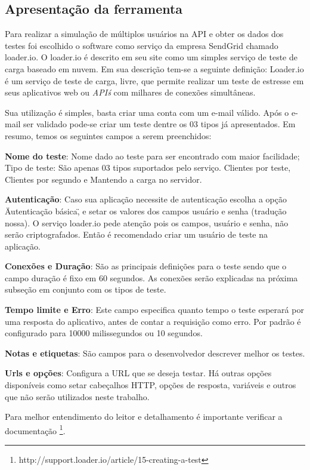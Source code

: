 \subsection{Apresentação da ferramenta}
  
  Para realizar a simulação de múltiplos usuários na \ac{API} e obter os dados dos testes foi 
  escolhido o software como serviço da empresa SendGrid chamado loader.io. O loader.io é descrito em seu site
  como um simples serviço de teste de carga baseado em nuvem. Em sua descrição tem-se a seguinte
  definição: Loader.io é um serviço de teste de carga, livre, que permite realizar um teste de estresse em 
  seus aplicativos web ou \textit{API\'s} com milhares de conexões simultâneas.
  
  Sua utilização é simples, basta criar uma conta com um e-mail válido. Após o e-mail ser validado pode-se 
  criar um teste dentre os 03 tipos já apresentados. Em resumo, temos os seguintes campos a serem preenchidos:
  
  \textbf{Nome do teste}: Nome dado ao teste para ser encontrado com maior facilidade;
  Tipo de teste: São apenas 03 tipos suportados pelo serviço. Clientes por teste, Clientes por segundo e Mantendo 
  a carga no servidor.
  
  \textbf{Autenticação}: Caso sua aplicação necessite de autenticação escolha a opção \"Autenticação básica\",
  e setar os valores dos campos usuário e senha (tradução nossa). O serviço loader.io pede atenção 
  pois os campos, usuário e senha, não serão criptografados. Então é recomendado criar um usuário de teste na aplicação.
  
  \textbf{Conexões e Duração}: São as principais definições para o teste sendo que o campo duração
  é fixo em 60 segundos. As conexões serão explicadas na próxima subseção em conjunto com os tipos de teste.
  
  \textbf{Tempo limite e Erro}: Este campo especifica quanto tempo o teste esperará por uma resposta do aplicativo, antes
  de contar a requisição como erro. Por padrão é configurado para 10000 milissegundos ou 10 segundos.
  
  \textbf{Notas e etiquetas}: São campos para o desenvolvedor descrever  melhor os testes.
  
  \textbf{Urls e opções}: Configura a \ac{URL} que se deseja testar. Há outras opções disponíveis como setar cabeçalhos \ac{HTTP},
  opções de resposta, variáveis e outros que não serão utilizados neste trabalho.
  
  Para melhor entendimento do leitor e detalhamento é importante verificar 
  a documentação \footnote{http://support.loader.io/article/15-creating-a-test}.
  
